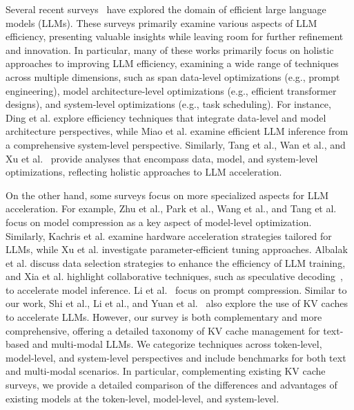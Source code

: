 Several recent surveys~\cite{zhu2023survey,zhuang2023survey,park2024comprehensive,wang2024model,ding2023efficiency,miao2023towards,wan2023efficient,zhou2024survey,tang2024survey,kachris2024survey,xu2023parameter,albalak2024survey,Awesome-LLM-Inference@2024} have explored the domain of efficient large language models (LLMs). These surveys primarily examine various aspects of LLM efficiency, presenting valuable insights while leaving room for further refinement and innovation.
In particular, many of these works
primarily focus on holistic approaches to improving LLM efficiency, examining a wide range of techniques across multiple dimensions, such as  span data-level optimizations (e.g., prompt engineering), model architecture-level optimizations (e.g., efficient transformer designs), and system-level optimizations (e.g., task scheduling).
For instance, Ding et al.\cite{ding2023efficiency} explore efficiency techniques that integrate data-level and model architecture perspectives, while Miao et al.\cite{miao2023towards} examine efficient LLM inference from a comprehensive system-level perspective. Similarly, Tang et al.\cite{tang2024survey}, Wan et al.\cite{wan2023efficient}, and Xu et al.~\cite{xu2023parameter} provide analyses that encompass data, model, and system-level optimizations, reflecting holistic approaches to LLM acceleration.

On the other hand, some surveys focus on more specialized aspects for LLM acceleration.
For example,
Zhu et al.\cite{zhu2023survey}, Park et al.\cite{park2024comprehensive}, Wang et al.\cite{wang2024model}, and Tang et al.\cite{tang2024survey} focus on model compression as a key aspect of model-level optimization. Similarly, Kachris et al.\cite{kachris2024survey} examine hardware acceleration strategies tailored for LLMs, while Xu et al.\cite{xu2023parameter} investigate parameter-efficient tuning approaches. Albalak et al.\cite{albalak2024survey} discuss data selection strategies to enhance the efficiency of LLM training, and Xia et al.\cite{xia2024unlocking} highlight collaborative techniques, such as speculative decoding~\cite{leviathan2023fast,kim2024speculative}, to accelerate model inference.
Li et al.~\cite{li2024prompt} focus on prompt compression.
Similar to our work, Shi et al.\cite{shi2024keep}, Li et al.\cite{li2024scbench}, and Yuan et al.~\cite{yuan2024kv} also explore the use of KV caches to accelerate LLMs. 
However, our survey is both complementary and more comprehensive, offering a detailed taxonomy of KV cache management for text-based and multi-modal LLMs.
We categorize techniques across token-level, model-level, and system-level perspectives and include benchmarks for both text and multi-modal scenarios.
In particular, complementing existing KV cache surveys, we provide a detailed comparison of the differences and advantages of existing models at the token-level, model-level, and system-level.







